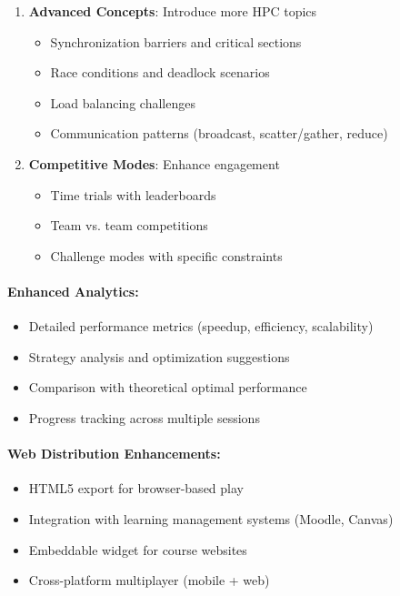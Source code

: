\begin{enumerate}
    \item \textbf{Advanced Concepts}: Introduce more HPC topics
          \begin{itemize}
              \item Synchronization barriers and critical sections
              \item Race conditions and deadlock scenarios
              \item Load balancing challenges
              \item Communication patterns (broadcast, scatter/gather, reduce)
          \end{itemize}

    \item \textbf{Competitive Modes}: Enhance engagement
          \begin{itemize}
              \item Time trials with leaderboards
              \item Team vs. team competitions
              \item Challenge modes with specific constraints
          \end{itemize}
\end{enumerate}

\paragraph*{Enhanced Analytics:}

\begin{itemize}
    \item Detailed performance metrics (speedup, efficiency, scalability)
    \item Strategy analysis and optimization suggestions
    \item Comparison with theoretical optimal performance
    \item Progress tracking across multiple sessions
\end{itemize}

\paragraph*{Web Distribution Enhancements:}

\begin{itemize}
    \item HTML5 export for browser-based play
    \item Integration with learning management systems (Moodle, Canvas)
    \item Embeddable widget for course websites
    \item Cross-platform multiplayer (mobile + web)
\end{itemize}

